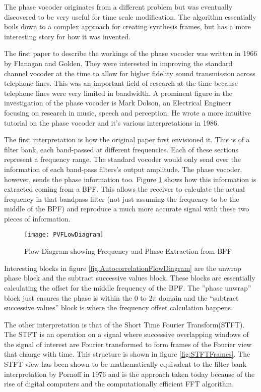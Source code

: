 The phase vocoder originates from a different problem but was eventually
discovered to be very useful for time scale modification. The algorithm
essentially boils down to a complex approach for creating synthesis frames, but
has a more interesting story for how it was invented.

The first paper to describe the workings of the phase vocoder was written in 1966
by Flanagan and Golden\cite{OriginalPhaseVocoder}. They were interested in
improving the standard channel vocoder at the time to allow for higher fidelity
sound transmission across telephone lines. This was an important field of research
at the time because telephone lines were very limited in bandwidth. A prominent
figure in the investigation of the phase vocoder is Mark Dolson, an Electrical
Engineer focusing on research in music, speech and perception. He wrote a more
intuitive tutorial on the phase vocoder and it's various interpretations in
1986\cite{DolsonTutorial}.

The first interpretation is how the original paper first envisioned it. This is of
a filter bank, each band-passed at different frequencies. Each of these sections
represent a frequency range. The standard vocoder would only send over the
information of each band-pass filters's output amplitude. The phase vocoder,
however, sends the phase information too. Figure \ref{fig:PVFLowDiagram} shows how
this information is extracted coming from a BPF. This allows the receiver to
calculate the actual frequency in that bandpass filter (not just assuming the
frequency to be the middle of the BPF) and reproduce a much more accurate signal
with these two pieces of information.

\begin{figure}[h]
	\texttt{[image: PVFLowDiagram]}
	\caption{Flow Diagram showing Frequency and Phase Extraction from
	BPF\cite{OriginalPhaseVocoder}}
	\label{fig:PVFLowDiagram}
\end{figure}

Interesting blocks in figure \ref{fig:AutocorrelationFlowDiagram} are the unwrap
phase block and the subtract successive values block. These blocks are essentially
calculating the offset for the middle frequency of the BPF. The ''phase unwrap''
block just ensures the phase is within the 0 to $2\pi$ domain and the ``subtract
successive values'' block is where the frequency offset calculation happens.

The other interpretation is that of the Short Time Fourier Transform(STFT). The
STFT is an operation on a signal where successive overlapping windows of the
signal of interest are Fourier transformed to form frames of the Fourier view that
change with time. This structure is shown in figure \ref{fig:STFTFrames}. The STFT
view has been shown to be mathematically equivalent to the filter bank
interpretation by Pornoff in 1976\cite{STFTPhaseVocoder} and is the approach taken
today because of the rise of digital computers and the computationally efficient
FFT algorithm.

